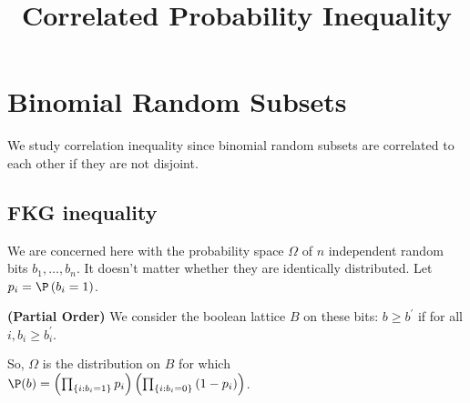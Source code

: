 \documentclass{article}
\title{Correlated Probability Inequality}
\newcommand{\bfs}[1]{\textbf{({#1})}}
\begin{document}
\maketitle


\section{Binomial Random Subsets}
We study correlation inequality since binomial random subsets are correlated to each other if they are not disjoint.
\subsection{FKG inequality}
We are concerned here with the probability space $\Omega$ of $n$ independent random  bits $b_{1}, \ldots, b_{n} .$ It doesn't matter whether they are identically distributed. Let $p_{i}=\P\left(b_{i}=1\right)$. 
\begin{defa}{\bfs{Partial Order}}\label{defa:po}
We consider the boolean lattice $B$ on these bits: $b \geq b^{\prime}$ if for all $i, b_{i} \geq b_{i}^{\prime} .$
\end{defa}

 So, $\Omega$ is the distribution on $B$ for which $\P(b)=\left(\prod_{\left\{i: b_{i}=1\right\}} p_{i}\right)\left(\prod_{\left\{i: b_{i}=0\right\}}\left(1-p_{i}\right)\right)$.
 
\end{document}
